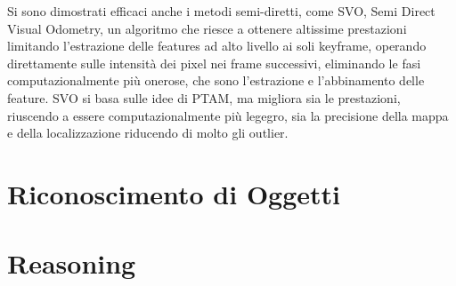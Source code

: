 Si sono dimostrati efficaci anche i metodi semi-diretti, come SVO, Semi Direct Visual Odometry, un algoritmo che riesce a ottenere altissime prestazioni limitando l'estrazione delle features ad alto livello ai soli keyframe, operando direttamente sulle intensità dei pixel nei frame successivi, eliminando le fasi computazionalmente più onerose, che sono l'estrazione e l'abbinamento delle feature. SVO si basa sulle idee di PTAM, ma migliora sia le prestazioni, riuscendo a essere computazionalmente più legegro, sia la precisione della mappa e della localizzazione riducendo di molto gli outlier.

\section{Riconoscimento di Oggetti}

\cite{Viola01rapidobject} \cite{Lienhart02anextended}

\section{Reasoning}
